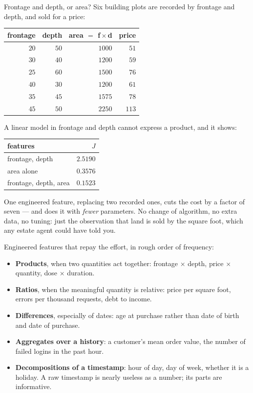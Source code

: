 \begin{workedexample}{Frontage and depth, or area?}
Six building plots are recorded by frontage and depth, and sold for a price:

\begin{center}
\small
\renewcommand{\arraystretch}{1.15}
\begin{tabular}{@{}rrrr@{}}
\toprule
frontage & depth & area $=$ f\,$\times$\,d & price\\
\midrule
$20$ & $50$ & $1000$ & $51$\\
$30$ & $40$ & $1200$ & $59$\\
$25$ & $60$ & $1500$ & $76$\\
$40$ & $30$ & $1200$ & $61$\\
$35$ & $45$ & $1575$ & $78$\\
$45$ & $50$ & $2250$ & $113$\\
\bottomrule
\end{tabular}
\end{center}

A linear model in frontage and depth cannot express a product, and it shows:

\begin{center}
\small
\begin{tabular}{@{}lr@{}}
\toprule
features & $J$\\
\midrule
frontage, depth        & $2.5190$\\
area alone             & $0.3576$\\
frontage, depth, area  & $0.1523$\\
\bottomrule
\end{tabular}
\end{center}

One engineered feature, replacing two recorded ones, cuts the cost by a factor
of seven --- and does it with \emph{fewer} parameters. No change of algorithm,
no extra data, no tuning: just the observation that land is sold by the square
foot, which any estate agent could have told you.
\end{workedexample}

Engineered features that repay the effort, in rough order of frequency:

\begin{itemize}
  \item \textbf{Products}, when two quantities act together: frontage $\times$
        depth, price $\times$ quantity, dose $\times$ duration.
  \item \textbf{Ratios}, when the meaningful quantity is relative: price per
        square foot, errors per thousand requests, debt to income.
  \item \textbf{Differences}, especially of dates: age at purchase rather than
        date of birth and date of purchase.
  \item \textbf{Aggregates over a history}: a customer's mean order value, the
        number of failed logins in the past hour.
  \item \textbf{Decompositions of a timestamp}: hour of day, day of week, whether
        it is a holiday. A raw timestamp is nearly useless as a number; its parts
        are informative.
\end{itemize}

